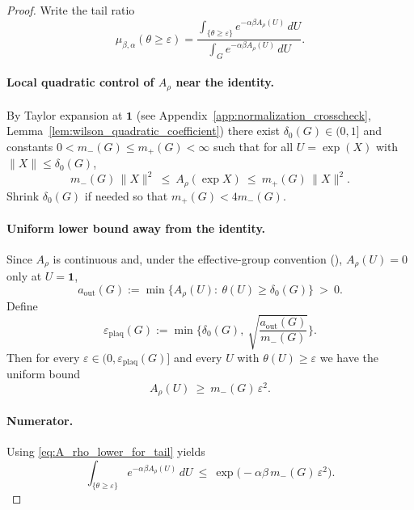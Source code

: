 \begin{proof}
Write the tail ratio
\[
\mu_{\beta,\alpha}(\theta\ge\varepsilon)=\frac{\int_{\{\theta\ge\varepsilon\}} e^{-\alpha\beta A_\rho(U)}\,dU}{\int_{G} e^{-\alpha\beta A_\rho(U)}\,dU}.
\]

\paragraph{Local quadratic control of $A_\rho$ near the identity.}
By Taylor expansion at $\mathbf 1$ (see Appendix~\ref{app:normalization_crosscheck}, Lemma~\ref{lem:wilson_quadratic_coefficient})
there exist $\delta_0(G)\in(0,1]$ and constants $0<m_-(G)\le m_+(G)<\infty$ such that for all $U=\exp(X)$ with $\|X\|\le \delta_0(G)$,
\begin{equation}\label{eq:A_rho_quad_bounds}
m_-(G)\,\|X\|^2\ \le\ A_\rho(\exp X)\ \le\ m_+(G)\,\|X\|^2.
\end{equation}
Shrink $\delta_0(G)$ if needed so that $m_+(G)<4m_-(G)$.

\paragraph{Uniform lower bound away from the identity.}
Since $A_\rho$ is continuous and, under the effective-group convention (),
$A_\rho(U)=0$ only at $U=\mathbf 1$,
\[
a_{\mathrm{out}}(G):=\min\{A_\rho(U):\ \theta(U)\ge \delta_0(G)\}\ >\ 0.
\]
Define
\[
\varepsilon_{\mathrm{plaq}}(G):=\min\Big\{\delta_0(G),\ \sqrt{\frac{a_{\mathrm{out}}(G)}{m_-(G)}}\Big\}.
\]
Then for every $\varepsilon\in(0,\varepsilon_{\mathrm{plaq}}(G)]$ and every $U$ with $\theta(U)\ge \varepsilon$ we have the uniform bound
\begin{equation}\label{eq:A_rho_lower_for_tail}
A_\rho(U)\ \ge\ m_-(G)\,\varepsilon^2.
\end{equation}

\paragraph{Numerator.}
Using \eqref{eq:A_rho_lower_for_tail} yields
\[
\int_{\{\theta\ge\varepsilon\}} e^{-\alpha\beta A_\rho(U)}\,dU\ \le\ \exp\!\big(-\alpha\beta\,m_-(G)\,\varepsilon^2\big).
\]


\end{proof}
